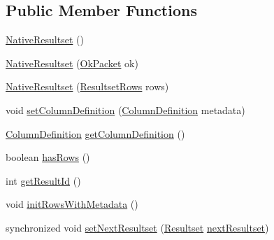 \subsection*{Public Member Functions}
\begin{DoxyCompactItemize}
\item 
\mbox{\hyperlink{classcom_1_1mysql_1_1cj_1_1protocol_1_1a_1_1result_1_1_native_resultset_a048db4569b2d9b91c64676a2d9183e8d}{Native\+Resultset}} ()
\item 
\mbox{\hyperlink{classcom_1_1mysql_1_1cj_1_1protocol_1_1a_1_1result_1_1_native_resultset_a3d5e1cead6b9cf22857d61765721592b}{Native\+Resultset}} (\mbox{\hyperlink{classcom_1_1mysql_1_1cj_1_1protocol_1_1a_1_1result_1_1_ok_packet}{Ok\+Packet}} ok)
\item 
\mbox{\hyperlink{classcom_1_1mysql_1_1cj_1_1protocol_1_1a_1_1result_1_1_native_resultset_a2365bcabea095ddb95d038c4f57535a2}{Native\+Resultset}} (\mbox{\hyperlink{interfacecom_1_1mysql_1_1cj_1_1protocol_1_1_resultset_rows}{Resultset\+Rows}} rows)
\item 
void \mbox{\hyperlink{classcom_1_1mysql_1_1cj_1_1protocol_1_1a_1_1result_1_1_native_resultset_a103a093ccb3cf34125ff020ddc9ad6d8}{set\+Column\+Definition}} (\mbox{\hyperlink{interfacecom_1_1mysql_1_1cj_1_1protocol_1_1_column_definition}{Column\+Definition}} metadata)
\item 
\mbox{\hyperlink{interfacecom_1_1mysql_1_1cj_1_1protocol_1_1_column_definition}{Column\+Definition}} \mbox{\hyperlink{classcom_1_1mysql_1_1cj_1_1protocol_1_1a_1_1result_1_1_native_resultset_a46cbcef39f6907dc5aa12d6f1353cf32}{get\+Column\+Definition}} ()
\item 
boolean \mbox{\hyperlink{classcom_1_1mysql_1_1cj_1_1protocol_1_1a_1_1result_1_1_native_resultset_a6873a98d8b78925b9260230838d280d2}{has\+Rows}} ()
\item 
int \mbox{\hyperlink{classcom_1_1mysql_1_1cj_1_1protocol_1_1a_1_1result_1_1_native_resultset_ad10ec652380313c1eb2cb1dd67c4ea7e}{get\+Result\+Id}} ()
\item 
void \mbox{\hyperlink{classcom_1_1mysql_1_1cj_1_1protocol_1_1a_1_1result_1_1_native_resultset_a55681e1e25bdf8a26e098f812979bec3}{init\+Rows\+With\+Metadata}} ()
\item 
synchronized void \mbox{\hyperlink{classcom_1_1mysql_1_1cj_1_1protocol_1_1a_1_1result_1_1_native_resultset_a69d6943f5f8f3e38a159e89897c583b2}{set\+Next\+Resultset}} (\mbox{\hyperlink{interfacecom_1_1mysql_1_1cj_1_1protocol_1_1_resultset}{Resultset}} \mbox{\hyperlink{classcom_1_1mysql_1_1cj_1_1protocol_1_1a_1_1result_1_1_native_resultset_a60ece486b7010abcf502f602c8a4512f}{next\+Resultset}})

\end{DoxyCompactItemize}

